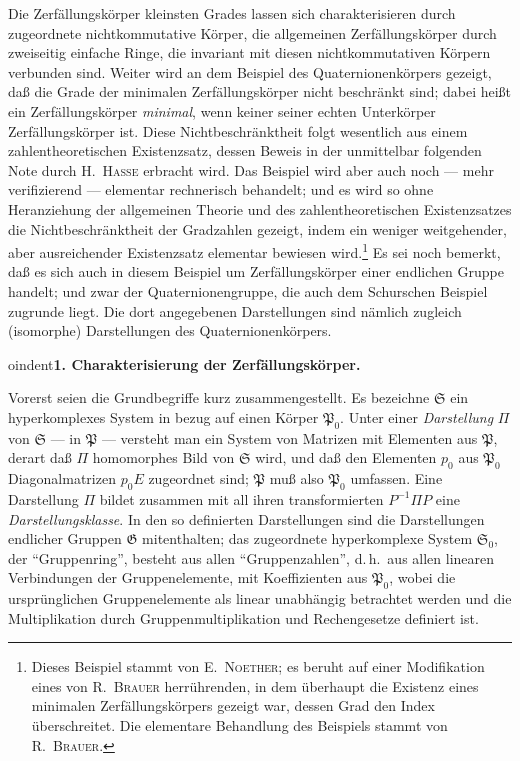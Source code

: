 \documentclass[12pt,a4paper]{article}
\newcommand{\PP}{\mathfrak{P}}          %
\theoremstyle{definition}
\begin{document}
Die Zerf\"allungsk\"orper kleinsten Grades lassen sich charakterisieren
durch zugeordnete nichtkommutative K\"orper, die allgemeinen
Zerf\"allungsk\"orper durch zweiseitig einfache Ringe, die invariant mit
diesen nichtkommutativen K\"orpern verbunden sind. Weiter wird an dem
Beispiel des Quaternionenk\"orpers gezeigt, da\ss{} die Grade der minimalen
Zerf\"allungsk\"orper nicht beschr\"ankt sind; dabei hei\ss t ein
Zerf\"allungsk\"orper \textit{minimal}, wenn keiner seiner echten Unterk\"orper
Zerf\"allungsk\"orper ist. Diese Nichtbeschr\"anktheit folgt wesentlich aus
einem zahlentheoretischen Existenzsatz, dessen Beweis in der unmittelbar
folgenden Note durch H.\ \textsc{Hasse} erbracht wird. Das Beispiel wird
aber auch noch --- mehr verifizierend --- elementar rechnerisch behandelt;
und es wird so ohne Heranziehung der allgemeinen Theorie und des
zahlentheoretischen Existenzsatzes die Nichtbeschr\"anktheit der Gradzahlen
gezeigt, indem ein weniger weitgehender, aber ausreichender Existenzsatz
elementar bewiesen wird.\footnote{Dieses Beispiel stammt von
E.\ \textsc{Noether}; es beruht auf einer Modifikation eines von
R.\ \textsc{Brauer} herr\"uhrenden, in dem \"uberhaupt die Existenz eines
minimalen Zerf\"allungsk\"orpers gezeigt war, dessen Grad den Index
\"uberschreitet. Die elementare Behandlung des Beispiels stammt von
R.\ \textsc{Brauer}.} Es sei noch bemerkt, da\ss{} es sich auch in diesem
Beispiel um Zerf\"allungsk\"orper einer endlichen Gruppe handelt; und zwar
der Quaternionengruppe, die auch dem Schurschen Beispiel zugrunde liegt.
Die dort angegebenen Darstellungen sind n\"amlich zugleich (isomorphe)
Darstellungen des Quaternionenk\"orpers.

\medskip



oindent\textbf{1. Charakterisierung der Zerf\"allungsk\"orper.}

\smallskip

Vorerst seien die Grundbegriffe kurz zusammengestellt. Es bezeichne
$\mathfrak{S}$ ein hyperkomplexes System in bezug auf einen K\"orper
$\PP_0$. Unter einer \textit{Darstellung} $\Pi$ von $\mathfrak{S}$ --- in $\PP$
--- versteht man ein System von Matrizen mit Elementen aus $\PP$, derart
da\ss{} $\Pi$ homomorphes Bild von $\mathfrak{S}$ wird, und da\ss{} den Elementen
$p_0$ aus $\PP_0$ Diagonalmatrizen $p_0 E$ zugeordnet sind; $\PP$ mu\ss{}
also $\PP_0$ umfassen. Eine Darstellung $\Pi$ bildet zusammen mit all ihren
transformierten $P^{-1}\Pi P$ eine \textit{Darstellungsklasse}. In den so
definierten Darstellungen sind die Darstellungen endlicher Gruppen
$\mathfrak{G}$ mitenthalten; das zugeordnete hyperkomplexe System
$\mathfrak{S}_0$, der ``Gruppenring'', besteht aus allen ``Gruppenzahlen'',
d.\,h.\ aus allen linearen Verbindungen der Gruppenelemente, mit
Koeffizienten aus $\PP_0$, wobei die urspr\"unglichen Gruppenelemente als
linear unabh\"angig betrachtet werden und die Multiplikation durch
Gruppenmultiplikation und Rechengesetze definiert ist.
\end{document}
